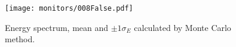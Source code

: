 \begin{figure}[htb]
\texttt{[image: monitors/008False.pdf]}
\caption{Energy spectrum, mean and $\pm 1\sigma_E$ calculated by Monte Carlo method.}
\label{fig:Spectrum0}
\end{figure}

